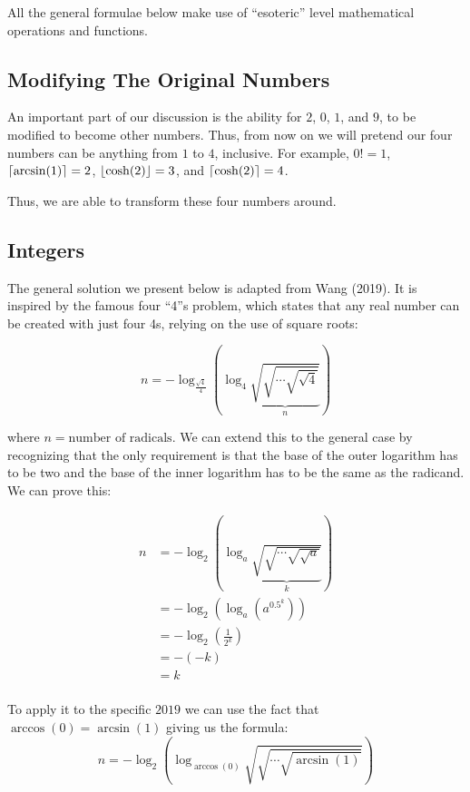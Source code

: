 All the general formulae below make use of ``esoteric'' level mathematical operations and functions.

\subsection{Modifying The Original Numbers}

An important part of our discussion is the ability for $2$, $0$, $1$, and $9$, to be modified to become other numbers. Thus, from now on we will pretend our four numbers can be anything from $1$ to $4$, inclusive. For example, $0! = 1$, $\lceil\arcsin(1)\rceil=2$, $\lfloor\cosh(2)\rfloor=3$, and $\lceil\cosh(2)\rceil=4$.

Thus, we are able to transform these four numbers around.

\subsection{Integers}

The general solution we present below is adapted from Wang (2019).
It is inspired by the famous four ``4''s  problem, which states that any real number can be created with just four 4s, relying on the use of square roots:

\begin{equation}
  n = -\log_\frac{\sqrt{4}}{4}\left( \log_4 \underbrace{\sqrt{\sqrt{\cdots\sqrt{\sqrt{4}}}}}_{n} \right)
\end{equation}

where $n=\textrm{number of radicals}$. We can extend this to the general case by recognizing that the only requirement is that the base of the outer logarithm has to be two and the base of the inner logarithm has to be the same as the radicand. We can prove this:

\begin{align*}
  n &= -\log_2\left(\log_a \underbrace{\sqrt{\sqrt{\cdots\sqrt{\sqrt{a}}}}}_{k} \right) \\
  &= -\log_2\left(\log_a \left(a^{0.5^k}\right)\right) \\
  &= -\log_2\left(\frac{1}{2^k}\right) \\
  &= -(-k) \\
  &= k \\
\end{align*}

To apply it to the specific $2019$ we can use the fact that $\arccos(0) = \arcsin(1)$ giving us the formula:
\begin{equation}
  n = -\log_2\left( \log_{\arccos(0)} \sqrt{\sqrt{\cdots\sqrt{\arcsin(1)}}}\right)
\end{equation}

